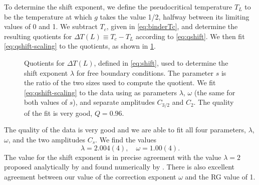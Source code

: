 To determine the shift exponent, we define the pseudocritical temperature $T_L$
to be the temperature at which $g$ takes the value 1/2, halfway between its
limiting values of 0 and 1. We subtract $T_c$, given in \cref{eq:binderTc},
and determine the resulting quotients for $\Delta T(L) \equiv T_c - T_L$
according to \cref{eq:qshift}. We then fit \cref{eq:qshift-scaling}
to the quotients, as shown in \cref{fig:qshift}.
\begin{figure}
  \centering
  
  \caption[
    Quotient estimation of the shift exponent $\lambda$ for the
    five-dimensional Ising model with free boundary conditions.
  ]
  {
    Quotients for $\Delta T(L)$, defined in \cref{eq:shift}, used to
    determine the shift exponent $\lambda$ for free boundary conditions. The
    parameter $s$ is the ratio of the two sizes used to compute the quotient.
    We fit \cref{eq:qshift-scaling} to the data using as parameters $\lambda$,
    $\omega$ (the same for both values of $s$), and separate amplitudes
    $C_{3/2}$ and $C_2$. The quality of the fit is very good, $Q=0.96$.
  } \label{fig:qshift}
\end{figure}
The quality of the data is very good and we are able to fit all four
parameters, $\lambda$, $\omega$, and the two amplitudes $C_s$. We find the
values
\begin{equation}
  \lambda = 2.004(4),\quad
  \omega = 1.00(4).
\end{equation}
The value for the shift exponent is in precise agreement with the value
$\lambda=2$ proposed analytically by \textcite{rudnick1985effect} and found
numerically by \textcite{berche2012hyperscaling}. There is also excellent
agreement between our value of the correction exponent $\omega$ and the RG
value of 1.

